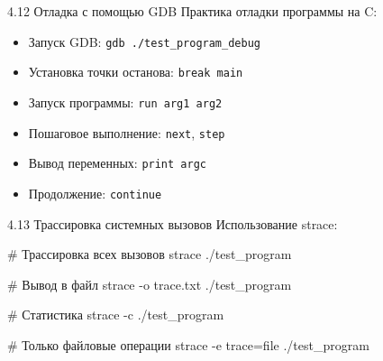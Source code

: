 \documentclass[
  ignorenonframetext,
  aspectratio=169,
  russian,
]{beamer}
\newenvironment{Shaded}{\begin{snugshade}}{\end{snugshade}}
\newcommand{\AttributeTok}[1]{\textcolor[rgb]{0.40,0.45,0.13}{#1}}
\newcommand{\CommentTok}[1]{\textcolor[rgb]{0.37,0.37,0.37}{#1}}
\newcommand{\ExtensionTok}[1]{\textcolor[rgb]{0.00,0.23,0.31}{#1}}
\newcommand{\NormalTok}[1]{\textcolor[rgb]{0.00,0.23,0.31}{#1}}
\providecommand{\tightlist}{%
  \setlength{\itemsep}{0pt}\setlength{\parskip}{0pt}}
\begin{document}
\begin{frame}[fragile]{4.12 Отладка с помощью GDB}
\label{ux43eux442ux43bux430ux434ux43aux430-ux441-ux43fux43eux43cux43eux449ux44cux44e-gdb-1}
Практика отладки программы на C:

\begin{itemize}[<+->]
\tightlist
\item
  Запуск GDB: \texttt{gdb\ ./test\_program\_debug}
\item
  Установка точки останова: \texttt{break\ main}
\item
  Запуск программы: \texttt{run\ arg1\ arg2}
\item
  Пошаговое выполнение: \texttt{next}, \texttt{step}
\item
  Вывод переменных: \texttt{print\ argc}
\item
  Продолжение: \texttt{continue}
\end{itemize}
\end{frame}

\begin{frame}[fragile]{4.13 Трассировка системных вызовов}
\label{ux442ux440ux430ux441ux441ux438ux440ux43eux432ux43aux430-ux441ux438ux441ux442ux435ux43cux43dux44bux445-ux432ux44bux437ux43eux432ux43eux432-1}
Использование strace:

\begin{Shaded}
\begin{Highlighting}[]
\CommentTok{\# Трассировка всех вызовов}
\ExtensionTok{strace}\NormalTok{ ./test\_program}

\CommentTok{\# Вывод в файл}
\ExtensionTok{strace} \AttributeTok{{-}o}\NormalTok{ trace.txt ./test\_program}

\CommentTok{\# Статистика}
\ExtensionTok{strace} \AttributeTok{{-}c}\NormalTok{ ./test\_program}

\CommentTok{\# Только файловые операции}
\ExtensionTok{strace} \AttributeTok{{-}e}\NormalTok{ trace=file ./test\_program}
\end{Highlighting}
\end{Shaded}
\end{frame}
\end{document}
